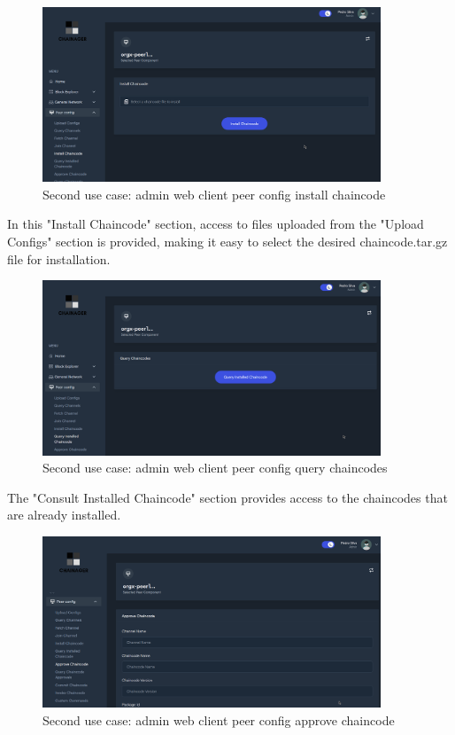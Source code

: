 \begin{figure}[H]
    \centering
    \includegraphics[width=0.9\textwidth]{assets/use-case-2/peer-config-install-chaincode.png} %
    \caption{Second use case: admin web client peer config install chaincode}
    \label{fig:sample-image} 
\end{figure}

In this "Install Chaincode" section, access to files uploaded from the "Upload Configs" section is provided, making it easy to select the desired chaincode.tar.gz file for installation.

\begin{figure}[H]
    \centering
    \includegraphics[width=0.9\textwidth]{assets/use-case-2/peer-config-query-chaincode.png} %
    \caption{Second use case: admin web client peer config query chaincodes}
    \label{fig:sample-image} 
\end{figure}

The "Consult Installed Chaincode" section provides access to the chaincodes that are already installed.

\begin{figure}[H]
    \centering
    \includegraphics[width=0.9\textwidth]{assets/use-case-2/peer-config-approve-chaincode.png} %
    \caption{Second use case: admin web client peer config approve chaincode}
    \label{fig:sample-image} 
\end{figure}

